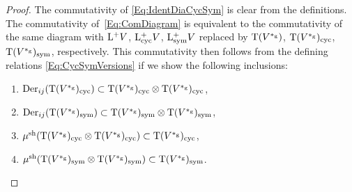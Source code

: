 \documentclass[\MainFolder/Text.tex]{subfiles}
\begin{document}
\begin{proof}
The commutativity of \eqref{Eq:IdentDiaCycSym} is clear from the definitions. The commutativity of~\eqref{Eq:ComDiagram} is equivalent to the commutativity of the same diagram with $\mathrm{L}^+ V$, $\mathrm{L}^+_{\mathrm{cyc}} V$, $\mathrm{L}_{\mathrm{sym}}^+ V$ replaced by $\mathrm{T}(V^{*_{\mathrm{g}}})$, $\mathrm{T}(V^{*_{\mathrm{g}}})_{\mathrm{cyc}}$, $\mathrm{T}(V^{*_{\mathrm{g}}})_{\mathrm{sym}}$, respectively. This commutativity then follows from the defining relations \eqref{Eq:CycSymVersions} if we show the following inclusions:
\begin{enumerate}[label=(\arabic*)]
\item $\mathrm{Der}_{ij}(\mathrm{T}(V^{*_{\mathrm{g}}})_{\mathrm{cyc}})\subset\mathrm{T}(V^{*_{\mathrm{g}}})_{\mathrm{cyc}}\otimes\mathrm{T}(V^{*_{\mathrm{g}}})_{\mathrm{cyc}}$, 
\item $\mathrm{Der}_{ij}(\mathrm{T}(V^{*_{\mathrm{g}}})_{\mathrm{sym}})\subset\mathrm{T}(V^{*_{\mathrm{g}}})_{\mathrm{sym}}\otimes\mathrm{T}(V^{*_{\mathrm{g}}})_{\mathrm{sym}}$,
\item $\mu^{\mathrm{sh}}(\mathrm{T}(V^{*_{\mathrm{g}}})_{\mathrm{cyc}}\otimes\mathrm{T}(V^{*_{\mathrm{g}}})_{\mathrm{cyc}})\subset \mathrm{T}(V^{*_{\mathrm{g}}})_{\mathrm{cyc}}$,
\item $\mu^{\mathrm{sh}}(\mathrm{T}(V^{*_{\mathrm{g}}})_{\mathrm{sym}}\otimes\mathrm{T}(V^{*_{\mathrm{g}}})_{\mathrm{sym}})\subset \mathrm{T}(V^{*_{\mathrm{g}}})_{\mathrm{sym}}$. 
\end{enumerate}

\end{proof}
\end{document}
